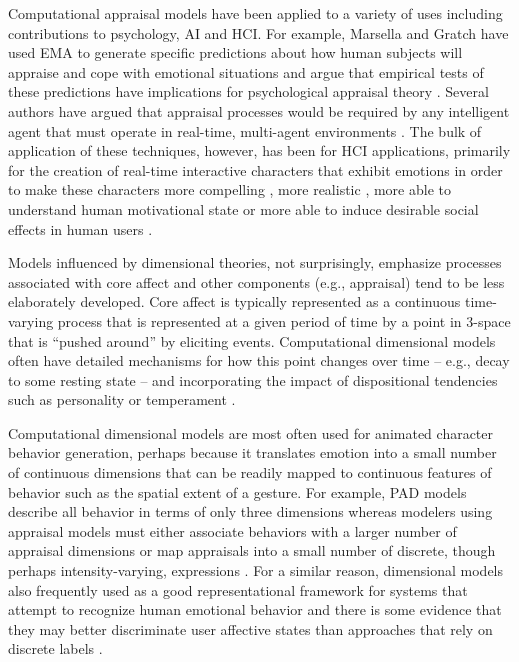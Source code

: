 \documentclass[11pt]{article}
\begin{document}
Computational appraisal models have been applied to a variety of uses including
contributions to psychology, AI and HCI. For example, Marsella and Gratch have
used EMA to generate specific predictions about how human subjects will appraise
and cope with emotional situations and argue that empirical tests of these
predictions have implications for psychological appraisal theory
\cite{gratch:assessing-appraisal} \cite{marsella:assessing-coping}. Several
authors have argued that appraisal processes would be required by any
intelligent agent that must operate in real-time, multi-agent environments
\cite{staller:emotion-social-norm} . The bulk of application of these
techniques, however, has been for HCI applications, primarily for the creation
of real-time interactive characters that exhibit emotions in order to make these
characters more compelling \cite{neal:believable-agents}, more realistic
\cite{mao:social-causality} \cite{traum:negotiation-teams-training}, more able
to understand human motivational state \cite{conati:evaluating-student-affect}
or more able to induce desirable social effects in human users
\cite{paiva:learning-feeling}.

Models influenced by dimensional theories, not surprisingly, emphasize processes
associated with core affect and other components (e.g., appraisal) tend to be
less elaborately developed. Core affect is typically represented as a continuous
time-varying process that is represented at a given period of time by a point in
3-space that is “pushed around” by eliciting events. Computational dimensional
models often have detailed mechanisms for how this point changes over time --
e.g., decay to some resting state -- and incorporating the impact of
dispositional tendencies such as personality or temperament \cite{gebhard:alma}.

Computational dimensional models are most often used for animated character
behavior generation, perhaps because it translates emotion into a small number
of continuous dimensions that can be readily mapped to continuous features of
behavior such as the spatial extent of a gesture. For example, PAD models
describe all behavior in terms of only three dimensions whereas modelers using
appraisal models must either associate behaviors with a larger number of
appraisal dimensions \cite{scherer:expression-appraisal}
\cite{smith:computational-facial-expression} or map appraisals into a small
number of discrete, though perhaps intensity-varying, expressions
\cite{elliott:affective-reasoner}. For a similar reason, dimensional models also
frequently used as a good representational framework for systems that attempt to
recognize human emotional behavior and there is some evidence that they may
better discriminate user affective states than approaches that rely on discrete
labels \cite{barrett:emotions-natural}.
\end{document}
